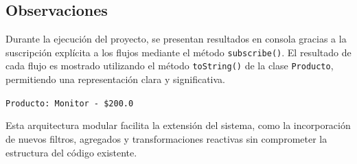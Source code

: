 \subsection{Observaciones}

Durante la ejecución del proyecto, se presentan resultados en consola gracias a la suscripción explícita a los flujos mediante el método \texttt{subscribe()}. El resultado de cada flujo es mostrado utilizando el método \texttt{toString()} de la clase \texttt{Producto}, permitiendo una representación clara y significativa.

\begin{center}
\texttt{Producto: Monitor - \$200.0}
\end{center}

Esta arquitectura modular facilita la extensión del sistema, como la incorporación de nuevos filtros, agregados y transformaciones reactivas sin comprometer la estructura del código existente.
